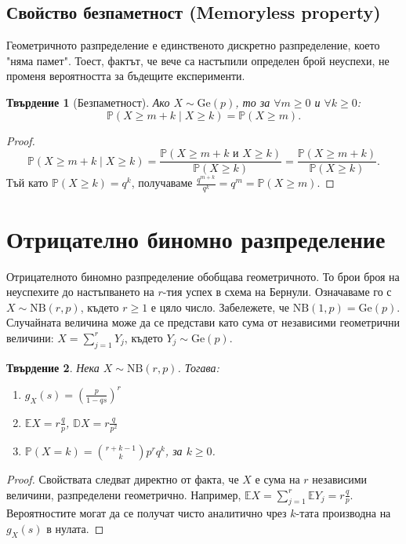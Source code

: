 \documentclass{article}
\newtheorem{theorem}{Твърдение}
\begin{document}
\subsection{Свойство безпаметност (Memoryless property)}
Геометричното разпределение е единственото дискретно разпределение, което "няма памет". Тоест, фактът, че вече са настъпили определен брой неуспехи, не променя вероятността за бъдещите експерименти.

\begin{theorem}[Безпаметност]
Ако $X \sim \text{Ge}(p)$, то за $\forall m \ge 0$ и $\forall k \ge 0$:
\[ \mathbb{P}(X \ge m+k \mid X \ge k) = \mathbb{P}(X \ge m). \]
\end{theorem}
\begin{proof}
\[ \mathbb{P}(X \ge m+k \mid X \ge k) = \frac{\mathbb{P}(X \ge m+k \text{ и } X \ge k)}{\mathbb{P}(X \ge k)} = \frac{\mathbb{P}(X \ge m+k)}{\mathbb{P}(X \ge k)}. \]
Тъй като $\mathbb{P}(X \ge k) = q^k$, получаваме $\frac{q^{m+k}}{q^k} = q^m = \mathbb{P}(X \ge m)$.
\end{proof}

\section{Отрицателно биномно разпределение}

Отрицателното биномно разпределение обобщава геометричното. То брои броя на неуспехите до настъпването на $r$-тия успех в схема на Бернули. Означаваме го с $X \sim \text{NB}(r, p)$, където $r \ge 1$ е цяло число.
Забележете, че $\text{NB}(1, p) = \text{Ge}(p)$.
Случайната величина може да се представи като сума от независими геометрични величини: $X = \sum_{j=1}^r Y_j$, където $Y_j \sim \text{Ge}(p)$.

\begin{theorem}
Нека $X \sim \text{NB}(r, p)$. Тогава:
\begin{enumerate}
    \item[а)] $g_X(s) = \left( \frac{p}{1-qs} \right)^r$
    \item[б)] $\mathbb{E}X = r\frac{q}{p}$, $\mathbb{D}X = r\frac{q}{p^2}$
    \item[в)] $\mathbb{P}(X=k) = \binom{r+k-1}{k} p^r q^k$, за $k \ge 0$.
\end{enumerate}
\end{theorem}
\begin{proof}
Свойствата следват директно от факта, че $X$ е сума на $r$ независими величини, разпределени геометрично.
Например, $\mathbb{E}X = \sum_{j=1}^r \mathbb{E}Y_j = r\frac{q}{p}$. 
Вероятностите могат да се получат чисто аналитично чрез $k$-тата производна на $g_X(s)$ в нулата.
\end{proof}
\end{document}
